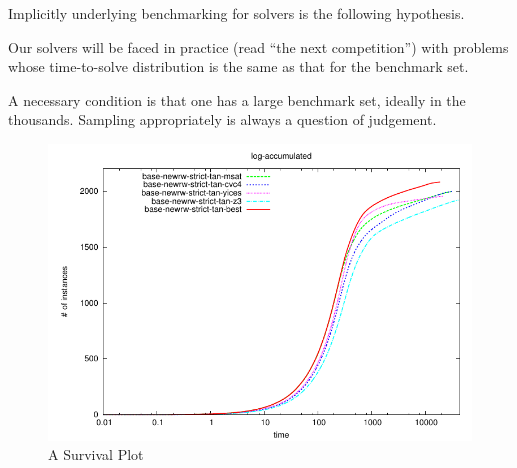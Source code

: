 Implicitly underlying benchmarking for solvers is the following hypothesis.
\begin{hypothesis}Our solvers will be faced in practice (read ``the next competition'') with problems whose time-to-solve distribution is the same as that for the benchmark set.
\end{hypothesis}
A necessary condition is that one has a large benchmark set, ideally in the thousands. Sampling appropriately is always a question of judgement.
\begin{figure}[h]
\caption{A Survival Plot\label{fig:survivor}}
\includegraphics{log-accumulated2.pdf}
\vskip-0pt
\end{figure}
